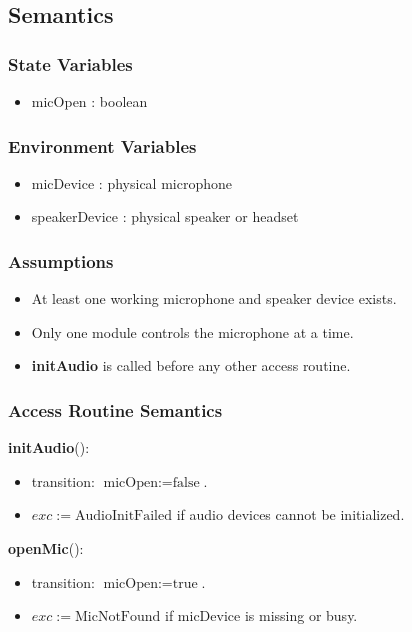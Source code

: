 \documentclass[12pt, titlepage]{article}
\begin{document}
\subsection{Semantics}

\subsubsection{State Variables}

\begin{itemize}
  \item micOpen : boolean
\end{itemize}

\subsubsection{Environment Variables}

\begin{itemize}
  \item micDevice : physical microphone
  \item speakerDevice : physical speaker or headset
\end{itemize}

\subsubsection{Assumptions}

\begin{itemize}
  \item At least one working microphone and speaker device exists.
  \item Only one module controls the microphone at a time.
  \item \textbf{initAudio} is called before any other access routine.
\end{itemize}

\subsubsection{Access Routine Semantics}

\noindent
\textbf{initAudio}():
\begin{itemize}
  \item transition: $\text{micOpen} := \text{false}$.
  \item $exc := \text{AudioInitFailed}$ if audio devices cannot be initialized.
\end{itemize}

\noindent
\textbf{openMic}():
\begin{itemize}
  \item transition: $\text{micOpen} := \text{true}$.
  \item $exc := \text{MicNotFound}$ if micDevice is missing or busy.
\end{itemize}
\end{document}
